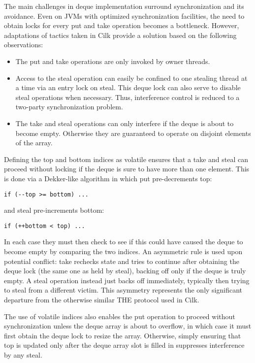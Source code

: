 The main challenges in deque implementation surround synchronization
and its avoidance. Even on JVMs with optimized synchronization
facilities, the need to obtain locks for every put and take operation
becomes a bottleneck.  However, adaptations of tactics taken in Cilk
\cite{Frigo1998} provide a solution based on the following
observations:

\begin{itemize}
\item The put and take operations are only invoked by owner threads.
\item Access to the steal operation can easily be confined to one
  stealing thread at a time via an entry lock on steal. This deque
  lock can also serve to disable steal operations when
  necessary. Thus, interference control is reduced to a two-party
  synchronization problem.
\item The take and steal operations can only interfere if the deque is
  about to become empty. Otherwise they are guaranteed to operate on
  disjoint elements of the array.
\end{itemize}

Defining the top and bottom indices as volatile ensures that a take
and steal can proceed without locking if the deque is sure to have
more than one element. This is done via a Dekker-like algorithm in
which put pre-decrements top:

\begin{lstlisting}
if (--top >= bottom) ...
\end{lstlisting}

and steal pre-increments bottom:

\begin{lstlisting}
if (++bottom < top) ...
\end{lstlisting}

In each case they must then check to see if this could have caused the
deque to become empty by comparing the two indices. An asymmetric rule
is used upon potential conflict: take rechecks state and tries to
continue after obtaining the deque lock (the same one as held by
steal), backing off only if the deque is truly empty. A steal
operation instead just backs off immediately, typically then trying to
steal from a different victim. This asymmetry represents the only
significant departure from the otherwise similar THE protocol used in
Cilk.

The use of volatile indices also enables the put operation to proceed
without synchronization unless the deque array is about to overflow,
in which case it must first obtain the deque lock to resize the
array. Otherwise, simply ensuring that top is updated only after the
deque array slot is filled in suppresses interference by any steal.

